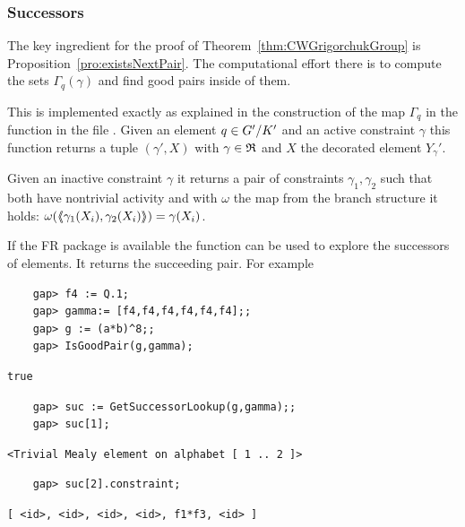 \documentclass[a4paper,11pt]{amsart}
\begin{document}
\subsubsection{Successors}
The key ingredient for the proof of Theorem~\ref{thm:CWGrigorchukGroup} is
Proposition~\ref{pro:existsNextPair}. The computational effort there is
to compute the sets $\Gamma_q(\gamma)$ and find good pairs inside of them.

This is implemented exactly as explained in the construction of the map
$\Gamma_q$ in the function  in the file 
. Given an element $q\in{G'/K'}$ 
and an active constraint $\gamma$ this function returns a tuple $(\gamma',X)$ 
with $\gamma\in\mathfrak{R}$ and $X$ the decorated element $Y_\gamma'$.

Given an inactive constraint $\gamma$ it returns a pair of constraints
$\gamma_1,\gamma_2$ such that both have nontrivial activity and with
$\omega$ the map from the branch structure it holds:
$\omega(\langle\negthickspace\langle\gamma_1(X_i),\gamma_2(X_i)\rangle\negthickspace\rangle)=\gamma(X_i)$. 

If the FR package is available
the function  can be used to explore the
successors of elements. It returns the succeeding pair. For example
 \begin{lstlisting}
    gap> f4 := Q.1;
    gap> gamma:= [f4,f4,f4,f4,f4,f4];;
    gap> g := (a*b)^8;;
    gap> IsGoodPair(g,gamma);
\end{lstlisting}
\begin{verbatim}
true
\end{verbatim} 
\begin{lstlisting}
    gap> suc := GetSuccessorLookup(g,gamma);;    
    gap> suc[1];
\end{lstlisting}
\begin{verbatim}
<Trivial Mealy element on alphabet [ 1 .. 2 ]>
\end{verbatim} 
\begin{lstlisting}
    gap> suc[2].constraint;
\end{lstlisting}
\begin{verbatim}
[ <id>, <id>, <id>, <id>, f1*f3, <id> ]
\end{verbatim} 





\appendix
% 
%
\end{document}
